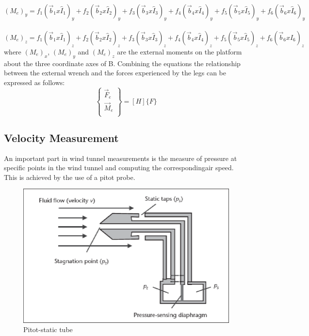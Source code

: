 \paragraph{}$(M_e)_y = f_1(\vec{b}_1 x \hat{I}_1)_y + f_2(\vec{b}_2 x \hat{I}_2)_y + f_3(\vec{b}_3 x \hat{I}_3)_y + f_4(\vec{b}_4 x \hat{I}_4)_y + f_5(\vec{b}_5 x \hat{I}_5)_y + f_6(\vec{b}_6 x \hat{I}_6)_y$
\paragraph{}$(M_e)_z = f_1(\vec{b}_1 x \hat{I}_1)_z + f_2(\vec{b}_2 x \hat{I}_2)_z + f_3(\vec{b}_3 x \hat{I}_3)_z + f_4(\vec{b}_4 x \hat{I}_4)_z + f_5(\vec{b}_5 x \hat{I}_5)_z + f_6(\vec{b}_6 x \hat{I}_6)_z$
where $(M_e)_x$, $(M_e)_y$ and $(M_e)_z$ are the external moments on the platform  about the three coordinate axes of B. Combining the equations the relationship between the external wrench and the forces experienced by the legs can be expressed as follows:
$$
\begin{Bmatrix}
\vec{F}_e \\
\vec{M}_e \\
\end{Bmatrix} = [H]\{F\}
$$

\subsection{Velocity Measurement}
An important part in wind tunnel measurements is the measure of pressure at specific points in the wind tunnel and computing the correspondingair speed. This is achieved by the use of a pitot probe. 
\begin{center}
\begin{figure}
\centering
\includegraphics{Figures/pitot}
\caption[Pitot-static tube]{Pitot-static tube \cite{noauthor_wind_nodate}}
\end{figure}
\end{center}

